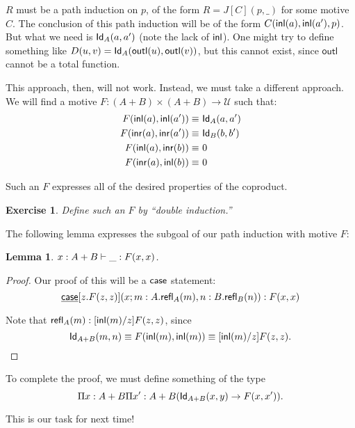 \documentclass[12pt]{article}
\newtheorem*{exercise}{Exercise}
\newtheorem*{lemma}{Lemma}
\begin{document}
$R$ must be a path induction on $p$, of the form $R=J[C](p,\_)$ for some motive $C$.
The conclusion of this path induction will be of the form $C({\mathsf{inl}}(a),{\mathsf{inl}}(a'),p)$.
But what we need is $\mathsf{Id}_{A}(a,a')$ (note the lack of ${\mathsf{inl}}$). One might try to define
something like $D(u,v)=\mathsf{Id}_{A}(\mathsf{outl}(u),\mathsf{outl}(v))$, but this cannot exist,
since $\mathsf{outl}$ cannot be a total function.

This approach, then, will not work. Instead, we must take a different approach. We will
find a motive $F: (A+B)\times (A+B) \to \mathcal{U}$ such that:
\begin{align*}
 F({\mathsf{inl}}(a),{\mathsf{inl}}(a'))\equiv &\ \mathsf{Id}_{A}(a,a') \\
 F({\mathsf{inr}}(a),{\mathsf{inr}}(a'))\equiv &\ \mathsf{Id}_{B}(b,b') \\
 F({\mathsf{inl}}(a),{\mathsf{inr}}(b)) \equiv &\ 0 \\
 F({\mathsf{inr}}(a),{\mathsf{inl}}(b)) \equiv &\ 0
\end{align*}

Such an $F$ expresses all of the desired properties of the coproduct.

\begin{exercise}Define such an $F$ by ``double induction.''
 
\end{exercise}

The following lemma expresses the subgoal of our path induction with motive $F$:
\begin{lemma}
 $x:A+B\vdash \_: F(x,x)$.
\end{lemma}

\begin{proof}
 Our proof of this will be a $\operatorname{\textsf{case}}$ statement:
 $$\underline{\operatorname{\textsf{case}}}[z.F(z,z)](x; m:A.\mathsf{refl}_{A}(m),n:B.\mathsf{refl}_{B}(n)): F(x,x)$$
 
 Note that $\mathsf{refl}_{A}(m):[{\mathsf{inl}}(m)/z]F(z,z)$, since 
 $$\mathsf{Id}_{A+B}(m,n)\equiv F({\mathsf{inl}}(m),{\mathsf{inl}}(m))\equiv [{\mathsf{inl}}(m)/z]F(z,z).$$
\end{proof}

To complete the proof, we must define something of the type
$$\Pi x:A+B \Pi x': A+B(\mathsf{Id}_{A+B}(x,y)\to F(x,x')).$$

This is our task for next time!



\end{document}
